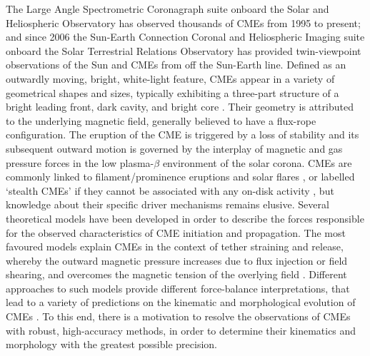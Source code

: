 \documentclass[preprint2]{aastex}
\begin{document}
The Large Angle Spectrometric Coronagraph suite \citep[LASCO;][]{1995SoPh..162..357B} onboard the Solar and Heliospheric Observatory \citep[SOHO;][]{1995SoPh..162....1D} has observed thousands of CMEs from 1995 to present; and since 2006 the Sun-Earth Connection Coronal and Heliospheric Imaging suite \citep[SECCHI;][]{2008SSRv..136...67H} onboard the Solar Terrestrial Relations Observatory \citep[STEREO;][]{2008SSRv..136....5K} has provided twin-viewpoint observations of the Sun and CMEs from off the Sun-Earth line. Defined as an outwardly moving, bright, white-light feature, CMEs appear in a variety of geometrical shapes and sizes, typically exhibiting a three-part structure of a bright leading front, dark cavity, and bright core \citep{1985JGR....90..275I}. Their geometry is attributed to the underlying magnetic field, generally believed to have a flux-rope configuration. The eruption of the CME is triggered by a loss of stability and its subsequent outward motion is governed by the interplay of magnetic and gas pressure forces in the low plasma-$\beta$ environment of the solar corona. CMEs are commonly linked to filament/prominence eruptions and solar flares \citep{2002ApJ...581..694M, 2002ApJ...566L.117Z}, or labelled `stealth CMEs' if they cannot be associated with any on-disk activity \citep{2009ApJ...701..283R}, but knowledge about their specific driver mechanisms remains elusive. Several theoretical models have been developed in order to describe the forces responsible for the observed characteristics of CME initiation and propagation. The most favoured models explain CMEs in the context of tether straining and release, whereby the outward magnetic pressure increases  due to flux injection or field shearing, and overcomes the magnetic tension of the overlying field \citep{2001AGUGM.125..143K}. Different approaches to such models provide different force-balance interpretations, that lead to a variety of predictions on the kinematic and morphological evolution of CMEs \citep[e.g.][]{2002A&ARv..10..313P, 2003JGRA..108.1410C, 2006PhRvL..96y5002K, 2008ApJ...683.1192L}. To this end, there is a motivation to resolve the observations of CMEs with robust, high-accuracy methods, in order to determine their kinematics and morphology with the greatest possible precision.
\end{document}
